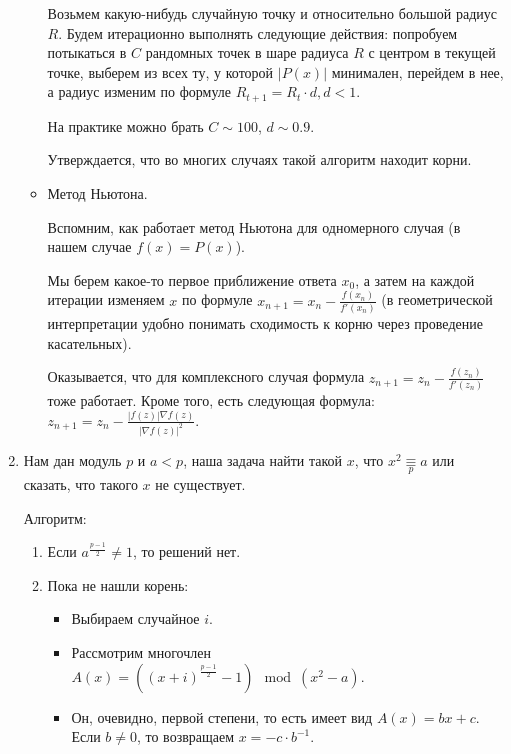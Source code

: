 \begin{enumerate}
\begin{itemize}
				Возьмем какую-нибудь случайную точку и относительно большой радиус $R$.
				Будем итерационно выполнять следующие действия: попробуем потыкаться в $C$ рандомных точек в шаре радиуса $R$ с центром в текущей точке,
				выберем из всех ту, у которой $|P(x)|$ минимален, перейдем в нее, а радиус изменим по формуле $R_{t+1} = R_t \cdot d, d < 1$.

				На практике можно брать $C{\sim}100$, $d{\sim}0.9$.

				Утверждается, что во многих случаях такой алгоритм находит корни.

			\item
				Метод Ньютона.

				Вспомним, как работает метод Ньютона для одномерного случая (в нашем случае $f(x) = P(x)$).

				Мы берем какое-то первое приближение ответа $x_0$, а затем на каждой итерации изменяем $x$ по формуле $x_{n+1} = x_n - \frac{f(x_n)}{f'(x_n)}$ (в геометрической интерпретации удобно понимать сходимость к корню через проведение касательных).

				Оказывается, что для комплексного случая формула $z_{n+1} = z_n - \frac{f(z_n)}{f'(z_n)}$ тоже работает.
				Кроме того, есть следующая формула: $z_{n+1} = z_n - \frac{|f(z)|\nabla f(z)}{|\nabla f(z)|^2}$.

		\end{itemize}                                                                                                                         
	\item
		Нам дан модуль $p$ и $a<p$, наша задача найти такой $x$, что $x^2 \underset{p}{\equiv} a$ или сказать, что такого $x$ не существует.

		Алгоритм:

		\begin{enumerate}
			\item
				Если $a^\frac{p-1}{2} \ne 1$, то решений нет.
			
			\item
				Пока не нашли корень:

				\begin{itemize}
					\item
						Выбираем случайное $i$.

					\item
						Рассмотрим многочлен $A(x) = ((x+i)^\frac{p-1}{2} - 1) \mod (x^2-a)$.

					\item
						Он, очевидно, первой степени, то есть имеет вид $A(x) = bx+c$.
						Если $b \ne 0$, то возвращаем $x = -c \cdot b^{-1}$.									
				\end{itemize}
		\end{enumerate}
	

\end{enumerate}
